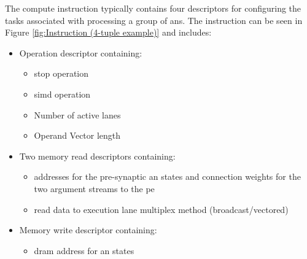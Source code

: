 The compute instruction typically contains four descriptors for configuring the tasks associated with processing a group of \acp{an}.
The instruction can be seen in Figure \ref{fig:Instruction (4-tuple example)} and includes: 
\begin{itemize}
  \item Operation descriptor containing:
    \begin{itemize}
      \item \ac{stop} operation
      \item \ac{simd} operation
      \item Number of active lanes
      \item Operand Vector length
    \end{itemize}
  \item Two memory read descriptors containing:
    \begin{itemize}
        \item addresses for the pre-synaptic \ac{an} states and connection weights for the two argument streams to the \ac{pe}
        \item read data to execution lane multiplex method (broadcast/vectored)
    \end{itemize}
  \item Memory write descriptor containing:
    \begin{itemize}
      \item \ac{dram} address for \ac{an} states
    \end{itemize}
\end{itemize}
\iffalse
\begin{figure}[!t]
\centering
\captionsetup{justification=centering}
\captionsetup{width=.9\linewidth}
\centerline{
\mbox{\texttt{[image: instruction4Tuple]}}
}
\caption{Typical compute instruction (4-tuple)}
\label{fig:Instruction (4-tuple example)}
\end{figure}
\fi
